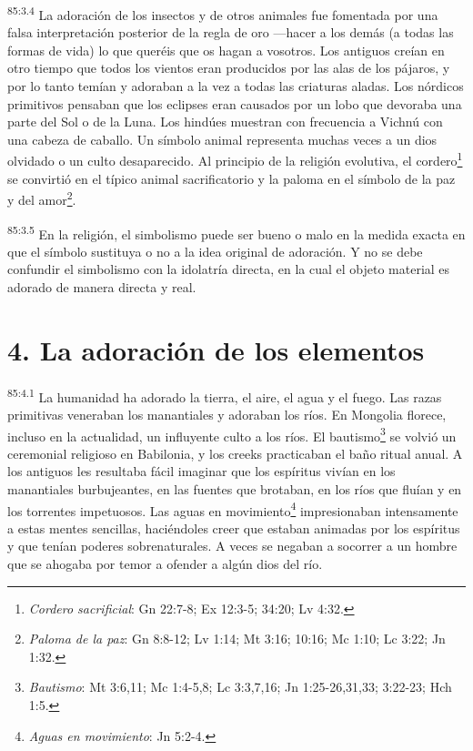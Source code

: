 \par
\textsuperscript{85:3.4} La adoración de los insectos y de otros animales fue fomentada por una falsa interpretación posterior de la regla de oro ---hacer a los demás (a todas las formas de vida) lo que queréis que os hagan a vosotros. Los antiguos creían en otro tiempo que todos los vientos eran producidos por las alas de los pájaros, y por lo tanto temían y adoraban a la vez a todas las criaturas aladas. Los nórdicos primitivos pensaban que los eclipses eran causados por un lobo que devoraba una parte del Sol o de la Luna. Los hindúes muestran con frecuencia a Vichnú con una cabeza de caballo. Un símbolo animal representa muchas veces a un dios olvidado o un culto desaparecido. Al principio de la religión evolutiva, el cordero\footnote{\textit{Cordero sacrificial}: Gn 22:7-8; Ex 12:3-5; 34:20; Lv 4:32.} se convirtió en el típico animal sacrificatorio y la paloma en el símbolo de la paz y del amor\footnote{\textit{Paloma de la paz}: Gn 8:8-12; Lv 1:14; Mt 3:16; 10:16; Mc 1:10; Lc 3:22; Jn 1:32.}.

\par
\textsuperscript{85:3.5} En la religión, el simbolismo puede ser bueno o malo en la medida exacta en que el símbolo sustituya o no a la idea original de adoración. Y no se debe confundir el simbolismo con la idolatría directa, en la cual el objeto material es adorado de manera directa y real.

\section*{4. La adoración de los elementos}
\par
\textsuperscript{85:4.1} La humanidad ha adorado la tierra, el aire, el agua y el fuego. Las razas primitivas veneraban los manantiales y adoraban los ríos. En Mongolia florece, incluso en la actualidad, un influyente culto a los ríos. El bautismo\footnote{\textit{Bautismo}: Mt 3:6,11; Mc 1:4-5,8; Lc 3:3,7,16; Jn 1:25-26,31,33; 3:22-23; Hch 1:5.} se volvió un ceremonial religioso en Babilonia, y los creeks practicaban el baño ritual anual. A los antiguos les resultaba fácil imaginar que los espíritus vivían en los manantiales burbujeantes, en las fuentes que brotaban, en los ríos que fluían y en los torrentes impetuosos. Las aguas en movimiento\footnote{\textit{Aguas en movimiento}: Jn 5:2-4.} impresionaban intensamente a estas mentes sencillas, haciéndoles creer que estaban animadas por los espíritus y que tenían poderes sobrenaturales. A veces se negaban a socorrer a un hombre que se ahogaba por temor a ofender a algún dios del río.


